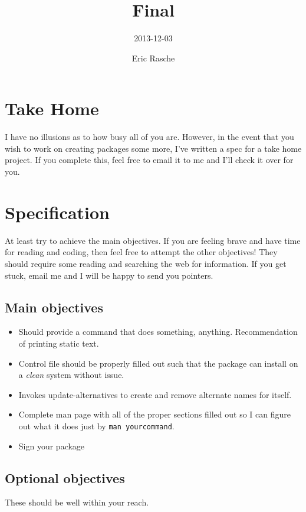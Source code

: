 \documentclass[]{article}
\title{Final}
\author{2013-12-03}
\date{Eric Rasche}
\begin{document}
\maketitle

\section{Take Home}

I have no illusions as to how busy all of you are. However, in the event
that you wish to work on creating packages some more, I've written a
spec for a take home project. If you complete this, feel free to email
it to me and I'll check it over for you.

\section{Specification}

At least try to achieve the main objectives. If you are feeling brave
and have time for reading and coding, then feel free to attempt the
other objectives! They should require some reading and searching the web
for information. If you get stuck, email me and I will be happy to send
you pointers.

\subsection{Main objectives}

\begin{itemize}
\item
  Should provide a command that does something, anything. Recommendation
  of printing static text.
\item
  Control file should be properly filled out such that the package can
  install on a \emph{clean} system without issue.
\item
  Invokes update-alternatives to create and remove alternate names for
  itself.
\item
  Complete man page with all of the proper sections filled out so I can
  figure out what it does just by \texttt{man yourcommand}.
\item
  Sign your package
\end{itemize}
\subsection{Optional objectives}

These should be well within your reach.
\end{document}
